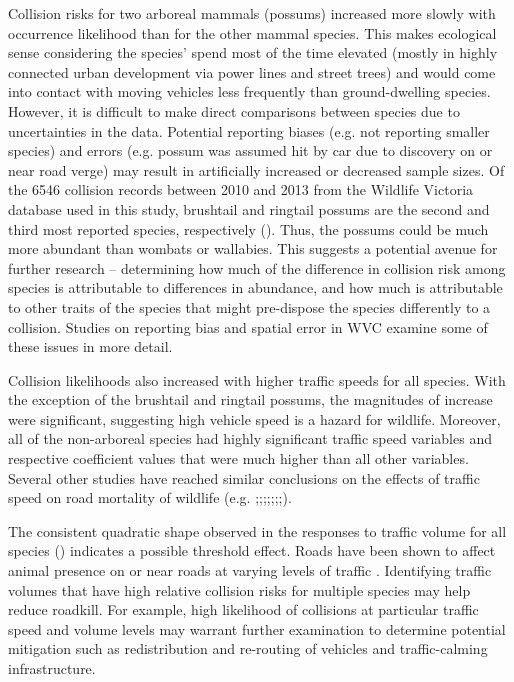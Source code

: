 Collision risks for two arboreal mammals (possums) increased more slowly with occurrence likelihood than for the other mammal species.  This makes ecological sense considering the species’ spend most of the time elevated (mostly in highly connected urban development via power lines and street trees) and would come into contact with moving vehicles less frequently than ground-dwelling species.  However, it is difficult to make direct comparisons between species due to uncertainties in the data.  Potential reporting biases (e.g. not reporting smaller species) and errors (e.g. possum was assumed hit by car due to discovery on or near road verge) may result in artificially increased or decreased sample sizes. Of the 6546 collision records between 2010 and 2013 from the Wildlife Victoria database used in this study, brushtail and ringtail possums are the second and third most reported species, respectively ().  Thus, the possums could be much more abundant than wombats or wallabies. This suggests a potential avenue for further research – determining how much of the difference in collision risk among species is attributable to differences in abundance, and how much is attributable to other traits of the species that might pre-dispose the species differently to a collision. Studies on reporting bias \citep{snow15} and spatial error \citep{guns09} in WVC examine some of these issues in more detail.

Collision likelihoods also increased with higher traffic speeds for all species.  With the exception of the brushtail and ringtail possums, the magnitudes of increase were significant, suggesting high vehicle speed is a hazard for wildlife.  Moreover, all of the non-arboreal species had highly significant traffic speed variables and respective coefficient values that were much higher than all other variables. Several other studies have reached similar conclusions on the effects of traffic speed on road mortality of wildlife (e.g. \cite{farm12};\cite{gkri13};\cite{lao11};\cite{ramp06};\cite{seil05};\cite{seil06};\cite{sudh09};\cite{vanl09}).

The consistent quadratic shape observed in the responses to traffic volume for all species () indicates a possible threshold effect.  Roads have been shown to affect animal presence on or near roads at varying levels of traffic \citep{jaeg05,rhod14}.  Identifying traffic volumes that have high relative collision risks for multiple species may help reduce roadkill.  For example, high likelihood of collisions at particular traffic speed and volume levels may warrant further examination to determine potential mitigation such as redistribution and re-routing of vehicles and traffic-calming infrastructure.

